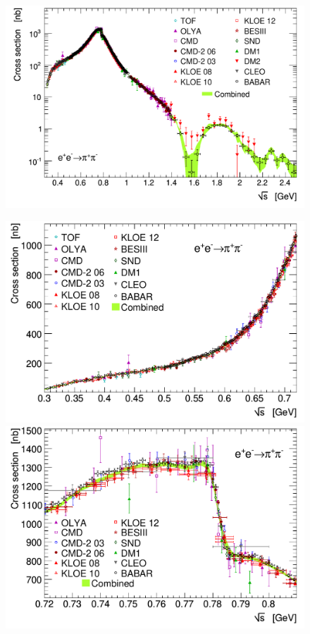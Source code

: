 \begin{figure}[p]
\begin{center}
\includegraphics[width=130mm]{Figures/combined_2pi_ePeM_to_piPpiM_log0,28-2,5GeV_dhmz19.pdf}
\vspace{0.5cm}

\includegraphics[width=\figsize]{Figures/combined_2pi_ePeM_to_piPpiM_0,3-0,72GeV_dhmz19.pdf}\hspace{\fighspace}
\includegraphics[width=\figsize]{Figures/combined_2pi_ePeM_to_piPpiM_0,72-0,81GeV_dhmz19.pdf}
\vspace{0.2cm}


\end{center}
\end{figure}
